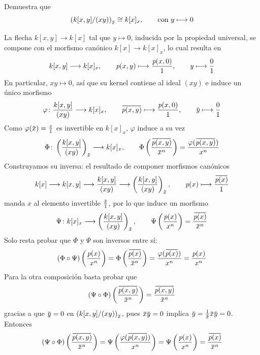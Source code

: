 \begin{ejer}
Demuestra que
\[
\left(k[x,y]/(xy)\right)_{\ubar x}\cong k[x]_x,
\qquad\text{con }y\longmapsto0
\]
\end{ejer}
\begin{sol}
La flecha $k[x,y]\to k[x]$ tal que $y\mapsto0$, inducida por la propiedad universal, se compone con el morfismo canónico $k[x]\to k[x]_x$, lo cual resulta en
\[
k[x,y]\longrightarrow k[x]_x,
\qquad
\operatorname{\textit{p}}(x,y)\longmapsto\frac{\operatorname{\textit{p}}(x,0)}{1},
\qquad
y\longmapsto\frac{0}{1}
\]
En particular, $xy\mapsto0$, así que su kernel contiene al ideal $(xy)$ e induce un único morfismo
\[
\varphi\colon\frac{k[x,y]}{(xy)}\longrightarrow k[x]_x,
\qquad
\ubar{\p(x,y)}\longmapsto\frac{\p(x,0)}{1},
\qquad
\ubar y\longmapsto\frac{0}{1}
\]
Como $\varphi(\ubar x)=\frac{x}{1}$ es invertible en $k[x]_x$, $\varphi$ induce a su vez
\[
\Phi\colon\left(\frac{k[x,y]}{(xy)}\right)_{\ubar x}\longrightarrow k[x]_x,
\qquad
\Phi\left(\frac{\ubar{\p(x,y)}}{\ubar x^n}\right)
=\frac{\varphi(\ubar{\p(x,y)})}{x^n}
\]
Construyamos su inversa: el resultado de componer morfismos canónicos
\[
k[x]\longrightarrow k[x,y]\longrightarrow\frac{k[x,y]}{(xy)}
\longrightarrow\left(\frac{k[x,y]}{(xy)}\right)_{\ubar x},
\qquad
\p(x)\longmapsto\frac{\ubar{\p(x)}}{1}
\]
manda $x$ al elemento invertible $\frac{\ubar x}{1}$, por lo que induce un morfismo
\[
\Psi\colon k[x]_x\longrightarrow\left(\frac{k[x,y]}{(xy)}\right)_{\ubar x},
\qquad
\Psi\left(\frac{\p(x)}{x^n}\right)=\frac{\ubar{\p(x)}}{\ubar x^n}
\]
Solo resta probar que $\Phi$ y $\Psi$ son inversos entre sí:
\[
(\Phi\circ\Psi)\left(\frac{\p(x)}{x^n}\right)
=\Phi\left(\frac{\ubar{\p(x)}}{\ubar x^n}\right)
=\frac{\varphi(\ubar{\p(x)})}{x^n}
=\frac{\p(x)}{x^n}
\]
Para la otra composición basta probar que
\[
(\Psi\circ\Phi)\left(\frac{\ubar{\p(x,y)}}{\ubar x^n}\right)
=\frac{\ubar{\p(x,y)}}{\ubar x^n}
\]
gracias a que $\ubar y=0$ en $\left(k[x,y]/(xy)\right)_{\ubar x}$, pues $\ubar x\ubar y=0$ implica $\ubar y=\frac{1}{\ubar x}\ubar x\ubar y=0$. Entonces
\[
(\Psi\circ\Phi)\left(\frac{\ubar{\p(x,y)}}{\ubar x^n}\right)
=\Psi\left(\frac{\varphi(\ubar{\p(x,y)})}{x^n}\right)
=\Psi\left(\frac{\p(x)}{x^n}\right)
=\frac{\ubar{\p(x)}}{\ubar x^n}
\]
\end{sol}
